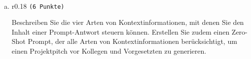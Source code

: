 \documentclass[12pt, ngerman]{AssignmentClass}
\begin{document}
    \begin{answerbox}
		\noindent
		\fbox{\parbox[c]{\textwidth}{
				\vspace{6cm}
				\hspace{\textwidth}
		}}\\
	\end{answerbox}

    \begin{enumerate}[b)]
		\item 
			\begin{minipage}[t]{\linewidth}
				\vspace{-0.61em}
				\begin{wrapfigure}[2]{r}{0.18\linewidth} 
					\raggedleft
					\texttt{(6 Punkte)}
				\end{wrapfigure}
                Beschreiben Sie die vier Arten von Kontextinformationen, mit denen Sie den Inhalt einer Prompt-Antwort steuern können. Erstellen Sie zudem einen Zero-Shot Prompt, der alle Arten von Kontextinformationen berücksichtigt, um einen Projektpitch vor Kollegen und Vorgesetzten zu generieren.
			\end{minipage}
	\end{enumerate}

	\begin{solution}
		\noindent
		\\
	\end{solution}

    \begin{answerbox}
		\noindent
		\fbox{\parbox[c]{\textwidth}{
				\vspace{8cm}
				\hspace{\textwidth}
		}}\\
	\end{answerbox}
\end{document}
